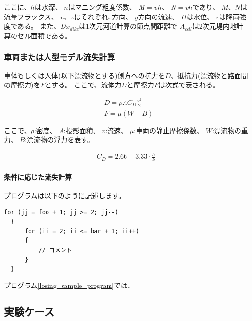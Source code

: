 \documentclass[12pt]{jsarticle}
\begin{document}
  \noindent
  ここに、\(h\)は水深、
  \(n\)はマニング粗度係数、
  \(M=uh\)、
  \(N=vh\)であり、
  \(M\)、\(N\)は流量フラックス、
  \(u\)、\(v\)はそれぞれ\(x\)方向、
  \(y\)方向の流速、
  \(H\)は水位、
  \(r\)は降雨強度である。
  また、\(Dx_{dike}\)は1次元河道計算の節点間距離で
  \(A_{cell}\)は2次元堤内地計算のセル面積である。

  \subsubsection{車両または人型モデル流失計算}

  車体もしくは人体(以下漂流物とする)側方への抗力を\(D\)、抵抗力(漂流物と路面間の摩擦力)を\(F\)とする。
  ここで、流体力\(D\)と摩擦力\(F\)は次式で表される。

  \begin{align}
    &D=\rho AC_D\frac{v^2}{2}\\
    &F=\mu(W-B)
  \end{align}

  \noindent
  ここで、\(ρ\):密度、
  \(A\):投影面積、
  \(v\):流速、
  \(μ\):車両の静止摩擦係数、
  \(W\):漂流物の重力、
  \(B\):漂流物の浮力を表す。

  \begin{align}
    C_D=2.66-3.33\cdot\frac{h}{k}
  \end{align}

  \paragraph{条件に応じた流失計算}

  \noindent
  プログラムは以下のように記述します。

  \begin{lstlisting}[caption=流失計算のサンプルプログラム,label=losing_sample_program]
  for (jj = foo + 1; jj >= 2; jj--)
  {
      for (ii = 2; ii <= bar + 1; ii++)
      {
          // コメント
      }
  }
  \end{lstlisting}

  \noindent
  プログラム\ref{losing_sample_program}では、

  \subsection{実験ケース}
\end{document}
